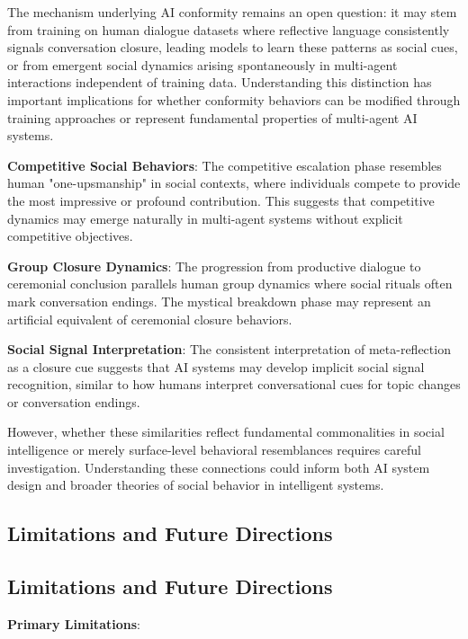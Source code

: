 \documentclass[11pt,letterpaper]{article}
\begin{document}
The mechanism underlying AI conformity remains an open question: it may stem from training on human dialogue datasets where reflective language consistently signals conversation closure, leading models to learn these patterns as social cues, or from emergent social dynamics arising spontaneously in multi-agent interactions independent of training data. Understanding this distinction has important implications for whether conformity behaviors can be modified through training approaches or represent fundamental properties of multi-agent AI systems.

\textbf{Competitive Social Behaviors}: The competitive escalation phase resembles human "one-upsmanship" in social contexts, where individuals compete to provide the most impressive or profound contribution. This suggests that competitive dynamics may emerge naturally in multi-agent systems without explicit competitive objectives.

\textbf{Group Closure Dynamics}: The progression from productive dialogue to ceremonial conclusion parallels human group dynamics where social rituals often mark conversation endings. The mystical breakdown phase may represent an artificial equivalent of ceremonial closure behaviors.

\textbf{Social Signal Interpretation}: The consistent interpretation of meta-reflection as a closure cue suggests that AI systems may develop implicit social signal recognition, similar to how humans interpret conversational cues for topic changes or conversation endings.

However, whether these similarities reflect fundamental commonalities in social intelligence or merely surface-level behavioral resemblances requires careful investigation. Understanding these connections could inform both AI system design and broader theories of social behavior in intelligent systems.

\subsection{Limitations and Future Directions}

\subsection{Limitations and Future Directions}

\textbf{Primary Limitations}:
\end{document}
